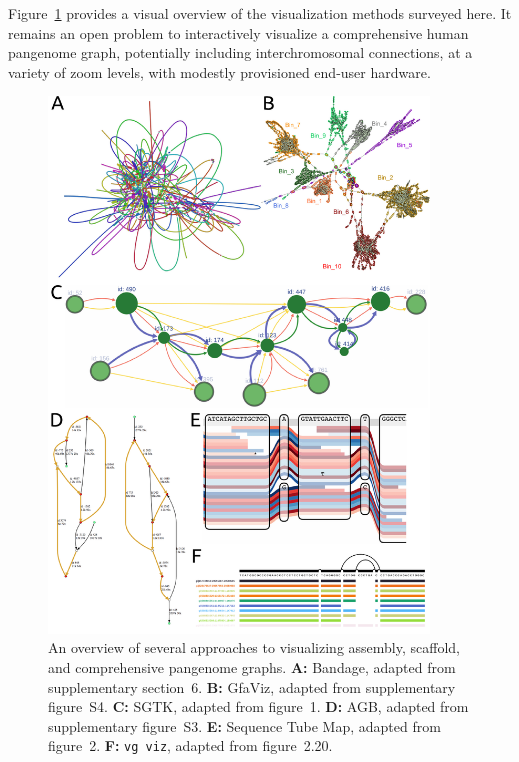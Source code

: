 Figure~\ref{fig:visualization} provides a visual overview of the visualization methods surveyed here.
It remains an open problem to interactively visualize a comprehensive human pangenome graph, potentially including interchromosomal connections, at a variety of zoom levels, with modestly provisioned end-user hardware.

\begin{figure}[h]
    \includegraphics[width=0.9\textwidth]{figures/visualization.pdf}
    \caption{\label{fig:visualization} An overview of several approaches to visualizing assembly, scaffold, and comprehensive pangenome graphs.
\textbf{A:} Bandage, adapted from \cite{Wick_2015} supplementary section~6.
\textbf{B:} GfaViz, adapted from \cite{Gonnella_2018} supplementary figure~S4.
\textbf{C:} SGTK, adapted from \cite{Kunyavskaya_2018} figure~1.
\textbf{D:} AGB, adapted from \cite{Mikheenko_2019} supplementary figure~S3.
\textbf{E:} Sequence Tube Map, adapted from \cite{Beyer_2019} figure~2.
\textbf{F:} \texttt{vg viz}, adapted from \cite{Garrison_2019} figure~2.20.}
\end{figure}

